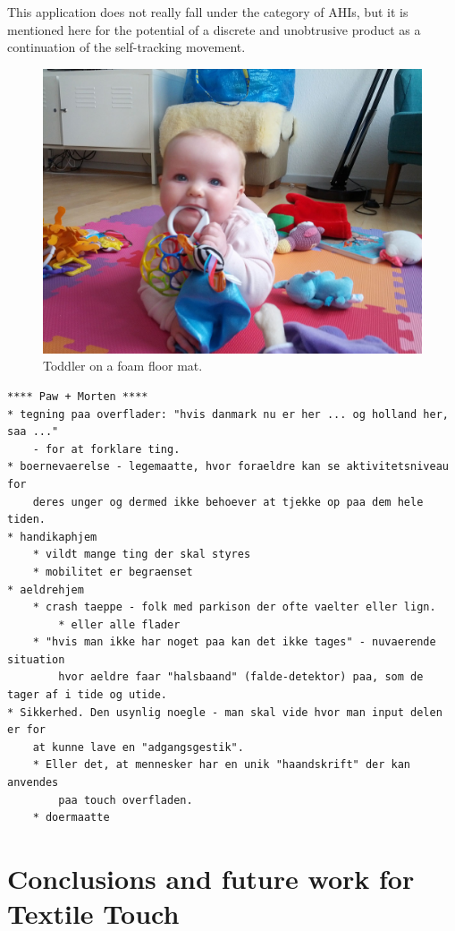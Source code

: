 This application does not really fall under the category of AHIs, but it is mentioned here for the potential of a discrete and unobtrusive product as a continuation of the self-tracking movement.


\begin{figure}[h]
  \centering
  \begin{minipage}[b]{.8\textwidth}
    \centering
    \includegraphics[width=.7\linewidth]{figures/touch/evaluation/softtiles}
  \caption[Toddler on a foam floor mat with puzzle-like tiles for extensibility.]
  {Toddler on a foam floor mat.}
  \label{fig:textiletouch:eval:softtiles}
  \end{minipage}
\end{figure}

\begin{verbatim}
**** Paw + Morten ****
* tegning paa overflader: "hvis danmark nu er her ... og holland her, saa ..." 
	- for at forklare ting.
* boernevaerelse - legemaatte, hvor foraeldre kan se aktivitetsniveau for 
	deres unger og dermed ikke behoever at tjekke op paa dem hele tiden.
* handikaphjem
	* vildt mange ting der skal styres
    * mobilitet er begraenset
* aeldrehjem
    * crash taeppe - folk med parkison der ofte vaelter eller lign.
        * eller alle flader
    * "hvis man ikke har noget paa kan det ikke tages" - nuvaerende situation 
		hvor aeldre faar "halsbaand" (falde-detektor) paa, som de tager af i tide og utide.
* Sikkerhed. Den usynlig noegle - man skal vide hvor man input delen er for 
	at kunne lave en "adgangsgestik".
    * Eller det, at mennesker har en unik "haandskrift" der kan anvendes 
		paa touch overfladen.
    * doermaatte
\end{verbatim}

\section{Conclusions and future work for Textile Touch}
\label{ch:textiletouch:futurework}


